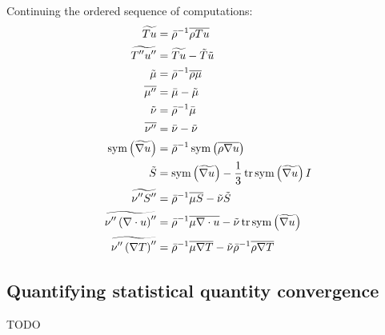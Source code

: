 Continuing the ordered sequence of computations:
{ \allowdisplaybreaks[1]
\begin{align}
  \widetilde{Tu} &= \bar{\rho}^{-1} \overline{\rho{}Tu}
\\
  \widetilde{T''u''} &= \widetilde{Tu} - \tilde{T}\tilde{u}
\\
  \tilde{\mu} &= \bar{\rho}^{-1} \overline{\rho\mu}
\\
  \overline{\mu''} &= \bar{\mu} - \tilde{\mu}
\\
  \tilde{\nu} &= \bar{\rho}^{-1} \bar{\mu}
\\
  \overline{\nu''} &= \bar{\nu} - \tilde{\nu}
\\
  \operatorname{sym}\left(\widetilde{\nabla{}u}\right)
  &= \bar{\rho}^{-1} \operatorname{sym}\left(\overline{\rho\nabla{}u}\right)
\\
  \tilde{S} &= \operatorname{sym}\left(\widetilde{\nabla{}u}\right)
   - \frac{1}{3} \operatorname{tr}\operatorname{sym}\left(\widetilde{\nabla{}u}\right) I
\\
  \widetilde{\nu''S''}
  &= \bar{\rho}^{-1} \overline{\mu{}S} - \tilde{\nu}\tilde{S}
\\
  \widetilde{\nu''\left(\nabla\cdot{}u\right)''}
  &= \bar{\rho}^{-1} \overline{\mu\nabla\cdot{}u}
   - \tilde{\nu}\operatorname{tr}\operatorname{sym}\left(\widetilde{\nabla{}u}\right)
\\
  \widetilde{\nu''\left(\nabla{}T\right)''}
  &= \bar{\rho}^{-1} \overline{\mu\nabla{}T}
   - \tilde{\nu} \bar{\rho}^{-1} \overline{\rho\nabla{}T}
\end{align}
}

\subsection{Quantifying statistical quantity convergence}
\label{sec:quantconvergence}

TODO
